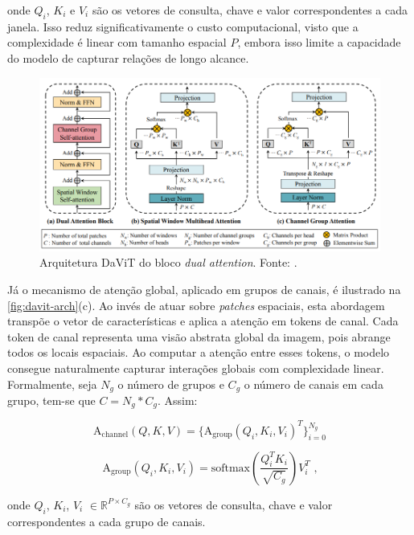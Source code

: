 onde $Q_i$, $K_i$ e $V_i$ são os vetores de consulta, chave e valor correspondentes a cada janela. Isso reduz significativamente o custo computacional, visto que a complexidade é linear com tamanho espacial $P$, embora isso limite a capacidade do modelo de capturar relações de longo alcance.

\begin{figure}[!htbp]
    \centering
    \includegraphics[width=\linewidth]{figs/davit-arch.png}
    \caption{Arquitetura DaViT do bloco \textit{dual attention}. Fonte: .}
    \label{fig:davit-arch}
\end{figure}

Já o mecanismo de atenção global, aplicado em grupos de canais, é ilustrado na \autoref{fig:davit-arch}(c). Ao invés de atuar sobre \textit{patches} espaciais, esta abordagem transpõe o vetor de características e aplica a atenção em tokens de canal. Cada token de canal representa uma visão abstrata global da imagem, pois abrange todos os locais espaciais. Ao computar a atenção entre esses tokens, o modelo consegue naturalmente capturar interações globais com complexidade linear. Formalmente, seja $N_g$ o número de grupos e $C_g$ o número de canais em cada grupo, tem-se que $C=N_g * C_g$. Assim:

\begin{equation}
    \text{A}_{\text{channel}}(Q, K, V) = \lbrace \text{A}_{\text{group}}(Q_i,K_i,V_i)^T \rbrace^{N_g}_{i=0}
\end{equation}

\begin{equation}
    \text{A}_{\text{group}}(Q_i, K_i, V_i) = \text{softmax}\left(\frac{Q_i^T K_i}{\sqrt{C_g}}\right) V_i^T \text{ ,}
\end{equation}

onde $Q_i$, $K_i$, $V_i$ $\in \mathbb{R}^{P \times C_g}$ são os vetores de consulta, chave e valor correspondentes a cada grupo de canais.

